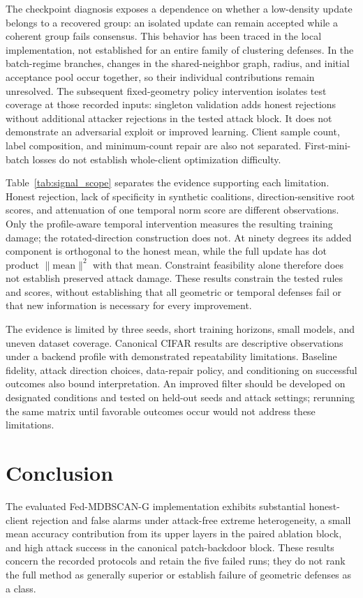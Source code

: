 \documentclass[journal]{IEEEtran}
\begin{document}
The checkpoint diagnosis exposes a dependence on whether a low-density update belongs to a recovered group: an isolated update can remain accepted while a coherent group fails consensus. This behavior has been traced in the local implementation, not established for an entire family of clustering defenses. In the batch-regime branches, changes in the shared-neighbor graph, radius, and initial acceptance pool occur together, so their individual contributions remain unresolved. The subsequent fixed-geometry policy intervention isolates test coverage at those recorded inputs: singleton validation adds honest rejections without additional attacker rejections in the tested attack block. It does not demonstrate an adversarial exploit or improved learning. Client sample count, label composition, and minimum-count repair are also not separated. First-mini-batch losses do not establish whole-client optimization difficulty.

Table~\ref{tab:signal_scope} separates the evidence supporting each limitation. Honest rejection, lack of specificity in synthetic coalitions, direction-sensitive root scores, and attenuation of one temporal norm score are different observations. Only the profile-aware temporal intervention measures the resulting training damage; the rotated-direction construction does not. At ninety degrees its added component is orthogonal to the honest mean, while the full update has dot product $\|\mathrm{mean}\|^2$ with that mean. Constraint feasibility alone therefore does not establish preserved attack damage. These results constrain the tested rules and scores, without establishing that all geometric or temporal defenses fail or that new information is necessary for every improvement.

The evidence is limited by three seeds, short training horizons, small models, and uneven dataset coverage. Canonical CIFAR results are descriptive observations under a backend profile with demonstrated repeatability limitations. Baseline fidelity, attack direction choices, data-repair policy, and conditioning on successful outcomes also bound interpretation. An improved filter should be developed on designated conditions and tested on held-out seeds and attack settings; rerunning the same matrix until favorable outcomes occur would not address these limitations.

\section{Conclusion}
The evaluated Fed-MDBSCAN-G implementation exhibits substantial honest-client rejection and false alarms under attack-free extreme heterogeneity, a small mean accuracy contribution from its upper layers in the paired ablation block, and high attack success in the canonical patch-backdoor block. These results concern the recorded protocols and retain the five failed runs; they do not rank the full method as generally superior or establish failure of geometric defenses as a class.
\end{document}
